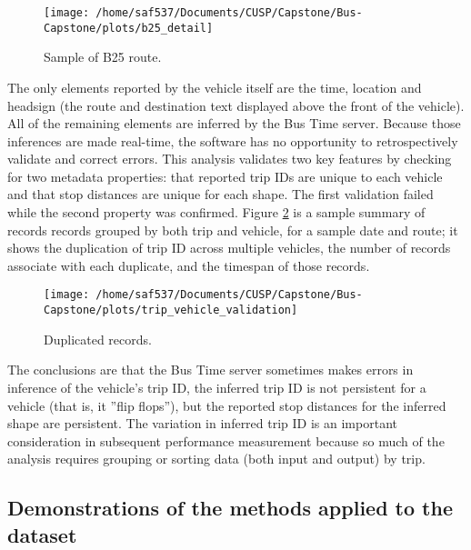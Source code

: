 \documentclass[12pt]{report}
\begin{document}
\begin{figure}[!ht]
\label{b26}
  \caption{Sample of B25 route.}
  \centering
    \texttt{[image: /home/saf537/Documents/CUSP/Capstone/Bus-Capstone/plots/b25\_detail]}
\end{figure}

The only elements reported by the vehicle itself are the time, location and headsign (the route and destination text displayed above the front of the vehicle).  All of the remaining elements are inferred by the Bus Time server.  Because those inferences are made real-time, the software has no opportunity to retrospectively validate and correct errors.  This analysis validates two key features by checking for two metadata properties: that reported trip IDs are unique to each vehicle and that stop distances are unique for each shape.  The first validation failed while the second property was confirmed.  Figure \ref{trip_val} is a sample summary of records records grouped by both trip and vehicle, for a sample date and route; it shows the duplication of trip ID across multiple vehicles, the number of records associate with each duplicate, and the timespan of those records.


\begin{figure}[!ht]
\label{trip_val}
  \caption{Duplicated records.}
  \centering
    \texttt{[image: /home/saf537/Documents/CUSP/Capstone/Bus-Capstone/plots/trip\_vehicle\_validation]}
\end{figure}

The conclusions are that the Bus Time server sometimes makes errors in inference of the vehicle's trip ID, the inferred trip ID is not persistent for a vehicle (that is, it ''flip flops''), but the reported stop distances for the inferred shape are persistent.  The variation in inferred trip ID is an important consideration in subsequent performance measurement because so much of the analysis requires grouping or sorting data (both input and output) by trip.




\subsection{Demonstrations of the methods applied to the dataset}
\end{document}
